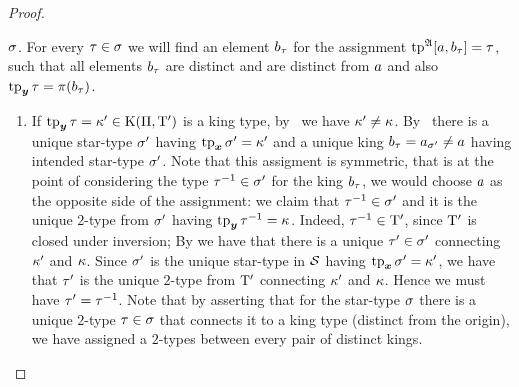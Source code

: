 \begin{proof}
\begin{description}
  $\sigma$.
  For every $\tau \in \sigma$ we will find an element $b_{\tau}$ for the
  assignment $\operatorname{tp}^{\mathfrak{A}}[a,b_{\tau}] = \tau$, such that all elements
  $b_{\tau}$ are distinct and are distinct from $a$ and also $\operatorname{tp}_{\bm{y}}\tau =
  \pi(b_{\tau})$.
  \begin{enumerate}
  \item If $\operatorname{tp}_{\bm{y}}\tau = {\kappa'} \in \mathrm{K}(\Pi,{\mathrm{T}'})$ is a king type,
  by~ we have ${\kappa'} \neq \kappa$. By~
  there is a unique star-type ${\sigma'}$ having $\operatorname{tp}_{\bm{x}}{\sigma'} = {\kappa'}$ and a unique
  king $b_{\tau} = a_{{\sigma'}} \neq a$ having intended star-type ${\sigma'}$.
  Note that this assigment is symmetric, that is at the point of considering the
  type $\tau^{-1} \in {\sigma'}$ for the king $b_{\tau}$, we would choose $a$ as
  the opposite side of the assignment: we claim that $\tau^{-1} \in
  {\sigma'}$ and it is the unique $2$-type from ${\sigma'}$ having $\operatorname{tp}_{\bm{y}}\tau^{-1}
  = \kappa$.
  Indeed, $\tau^{-1} \in {\mathrm{T}'}$, since ${\mathrm{T}'}$ is closed under inversion;
  By  we have that there is a unique ${\tau'} \in {\sigma'}$ connecting
  ${\kappa'}$ and $\kappa$. Since ${\sigma'}$ is the unique star-type in $\mathcal{S}$
  having $\operatorname{tp}_{\bm{x}}{\sigma'} = {\kappa'}$, we have that ${\tau'}$ is the unique $2$-type
  from ${\mathrm{T}'}$ connecting ${\kappa'}$ and $\kappa$. Hence we must have ${\tau'} =
  \tau^{-1}$.
  Note that by  asserting that for the star-type $\sigma$ there is a
  unique $2$-type $\tau \in \sigma$ that connects it to a king type (distinct
  from the origin), we have assigned a $2$-types between every pair of distinct
  kings.
  

\end{enumerate}
\end{description}
\end{proof}
